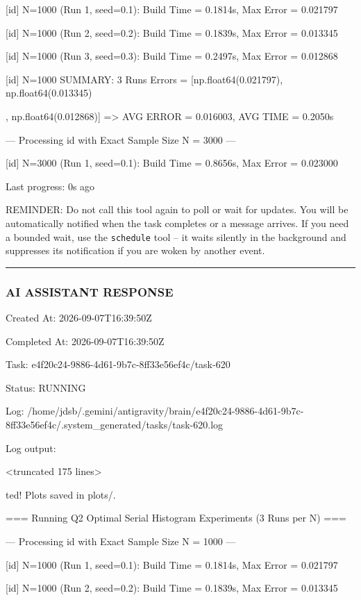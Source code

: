\documentclass[11pt,a4paper]{article}
\begin{document}
[id] N=1000 (Run 1, seed=0.1): Build Time = 0.1814s, Max Error = 0.021797

[id] N=1000 (Run 2, seed=0.2): Build Time = 0.1839s, Max Error = 0.013345

[id] N=1000 (Run 3, seed=0.3): Build Time = 0.2497s, Max Error = 0.012868

[id] N=1000 SUMMARY: 3 Runs Errors = [np.float64(0.021797), np.float64(0.013345)

, np.float64(0.012868)] => AVG ERROR = 0.016003, AVG TIME = 0.2050s

--- Processing id with Exact Sample Size N = 3000 ---

[id] N=3000 (Run 1, seed=0.1): Build Time = 0.8656s, Max Error = 0.023000


Last progress: 0s ago



REMINDER: Do not call this tool again to poll or wait for updates. You will be automatically notified when the task completes or a message arrives. If you need a bounded wait, use the \texttt{schedule} tool -- it waits silently in the background and suppresses its notification if you are woken by another event.


\hrule

\subsubsection{AI ASSISTANT RESPONSE}

Created At: 2026-09-07T16:39:50Z

Completed At: 2026-09-07T16:39:50Z

Task: e4f20c24-9886-4d61-9b7c-8ff33e56ef4c/task-620

Status: RUNNING

Log: /home/jdsb/.gemini/antigravity/brain/e4f20c24-9886-4d61-9b7c-8ff33e56ef4c/.system\_generated/tasks/task-620.log

Log output:

<truncated 175 lines>

ted! Plots saved in plots/.

=== Running Q2 Optimal Serial Histogram Experiments (3 Runs per N) ===


--- Processing id with Exact Sample Size N = 1000 ---

[id] N=1000 (Run 1, seed=0.1): Build Time = 0.1814s, Max Error = 0.021797

[id] N=1000 (Run 2, seed=0.2): Build Time = 0.1839s, Max Error = 0.013345
\end{document}
